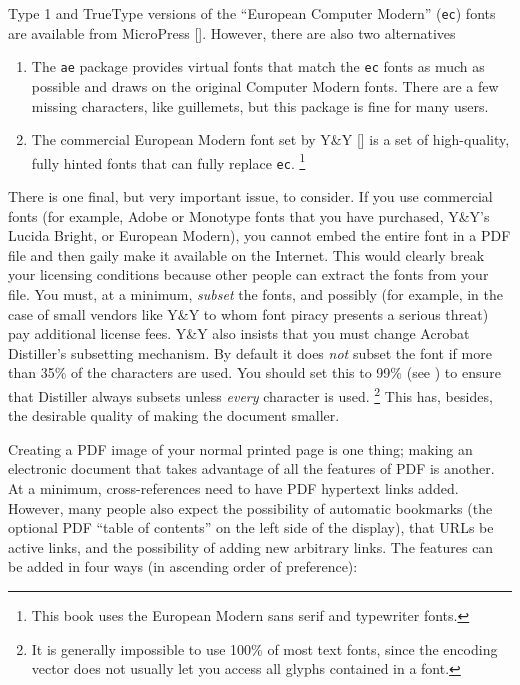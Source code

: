 Type 1 and TrueType versions of the ``European Computer Modern'' (\verb|ec|) fonts are 
available from MicroPress []. However, there are also two alternatives 

\begin{enumerate}
  \item The \verb|ae| package provides virtual fonts that match the
    \verb|ec| fonts as much as possible and draws on the original
    Computer Modern fonts. There are a few missing 
    characters, like guillemets, but this package is fine for many users. 
  \item  The commercial European Modern font set by Y\&Y [] is a set of 
    high-quality, fully hinted fonts that can fully replace \verb|ec|.
    \footnote{ This book uses the European Modern sans serif and typewriter fonts. }
\end{enumerate}

There is one final, but very important issue, to consider. If you use
commercial fonts (for example, Adobe or Monotype fonts that you have
purchased, Y\&Y's 
Lucida Bright, or European Modern), you cannot embed the entire font in a PDF 
file and then gaily make it available on the Internet. This would clearly break your 
licensing conditions because other people can extract the fonts from your file. You 
must, at a minimum, \emph{subset} the fonts, and possibly (for example, in the case of small 
vendors like Y\&Y to whom font piracy presents a serious threat) pay additional 
license fees. Y\&Y also insists that you must change Acrobat Distiller's subsetting 
mechanism. By default it does \emph{not} subset the font if more than
35\% of the characters are used. You should set this to 99\% (see ) to ensure that Distiller 
always subsets unless \emph{every} character is used. \footnote{
It is generally impossible to use 100\% of most text fonts, since the encoding vector does not usually 
let you access all glyphs contained in a font. 
} This has, besides, the desirable quality of making the document smaller. 



Creating a PDF image of your normal printed page is one thing; making an
electronic document that takes advantage of all the features of PDF is
another. At a minimum, cross-references need to have PDF hypertext links
added. However, many people also expect the possibility of automatic
bookmarks (the optional PDF ``table of contents'' on the left side of
the display), that URLs be active links, and the possibility of adding
new arbitrary links. The features can be added in four ways (in
ascending order of preference): 

